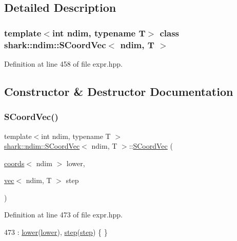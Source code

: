 \subsection{Detailed Description}
\subsubsection*{template$<$int ndim, typename T$>$\newline
class shark\+::ndim\+::\+S\+Coord\+Vec$<$ ndim, T $>$}



Definition at line 458 of file expr.\+hpp.



\subsection{Constructor \& Destructor Documentation}
\hypertarget{classshark_1_1ndim_1_1_s_coord_vec_a2206234f04728b090829ce9cdb3d0be1}{}\label{classshark_1_1ndim_1_1_s_coord_vec_a2206234f04728b090829ce9cdb3d0be1} 
\subsubsection{\texorpdfstring{S\+Coord\+Vec()}{SCoordVec()}}
{\footnotesize\ttfamily template$<$int ndim, typename T $>$ \\
\hyperlink{classshark_1_1ndim_1_1_s_coord_vec}{shark\+::ndim\+::\+S\+Coord\+Vec}$<$ ndim, T $>$\+::\hyperlink{classshark_1_1ndim_1_1_s_coord_vec}{S\+Coord\+Vec} (\begin{DoxyParamCaption}\item[{\hyperlink{structshark_1_1ndim_1_1coords}{coords}$<$ ndim $>$}]{lower,  }\item[{\hyperlink{structshark_1_1ndim_1_1vec}{vec}$<$ ndim, T $>$}]{step }\end{DoxyParamCaption})}



Definition at line 473 of file expr.\+hpp.


\begin{DoxyCode}
473 : \hyperlink{classshark_1_1ndim_1_1_s_coord_vec_aec6b26f59abee649139be7a517101d04}{lower}(\hyperlink{classshark_1_1ndim_1_1_s_coord_vec_aec6b26f59abee649139be7a517101d04}{lower}), \hyperlink{classshark_1_1ndim_1_1_s_coord_vec_aa2ce747ed08501f5fe6bf4a8c6b25a20}{step}(\hyperlink{classshark_1_1ndim_1_1_s_coord_vec_aa2ce747ed08501f5fe6bf4a8c6b25a20}{step}) \{ \}
\end{DoxyCode}
\hypertarget{classshark_1_1ndim_1_1_s_coord_vec_a965693ba29b2ccd952552ea6cd1c5f3e}{}\label{classshark_1_1ndim_1_1_s_coord_vec_a965693ba29b2ccd952552ea6cd1c5f3e} 
